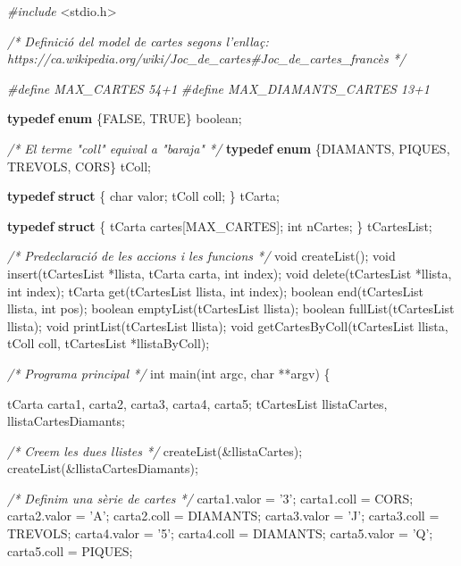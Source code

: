 \documentclass[]{book}
\newenvironment{Shaded}{\begin{snugshade}}{\end{snugshade}}
\newcommand{\KeywordTok}[1]{\textcolor[rgb]{0.13,0.29,0.53}{\textbf{#1}}}
\newcommand{\DataTypeTok}[1]{\textcolor[rgb]{0.13,0.29,0.53}{#1}}
\newcommand{\CharTok}[1]{\textcolor[rgb]{0.31,0.60,0.02}{#1}}
\newcommand{\ImportTok}[1]{#1}
\newcommand{\CommentTok}[1]{\textcolor[rgb]{0.56,0.35,0.01}{\textit{#1}}}
\newcommand{\PreprocessorTok}[1]{\textcolor[rgb]{0.56,0.35,0.01}{\textit{#1}}}
\newcommand{\NormalTok}[1]{#1}
\begin{document}
\begin{Shaded}
\begin{Highlighting}[]
\PreprocessorTok{#include }\ImportTok{<stdio.h>}

\CommentTok{/* Definició del model de cartes segons l'enllaç:}
\CommentTok{   https://ca.wikipedia.org/wiki/Joc_de_cartes#Joc_de_cartes_francès */}

\PreprocessorTok{#define MAX_CARTES 54+1}
\PreprocessorTok{#define MAX_DIAMANTS_CARTES 13+1}

\KeywordTok{typedef} \KeywordTok{enum}\NormalTok{ \{FALSE, TRUE\} boolean;}

\CommentTok{/* El terme "coll" equival a "baraja" */}
\KeywordTok{typedef} \KeywordTok{enum}\NormalTok{ \{DIAMANTS, PIQUES, TREVOLS, CORS\} tColl;}

\KeywordTok{typedef} \KeywordTok{struct}\NormalTok{ \{}
    \DataTypeTok{char}\NormalTok{ valor;}
\NormalTok{    tColl coll;}
\NormalTok{\} tCarta;}

\KeywordTok{typedef} \KeywordTok{struct}\NormalTok{ \{}
\NormalTok{    tCarta cartes[MAX_CARTES];}
    \DataTypeTok{int}\NormalTok{ nCartes;}
\NormalTok{\} tCartesList;}

\CommentTok{/* Predeclaració de les accions i les funcions */}
\DataTypeTok{void}\NormalTok{ createList();}
\DataTypeTok{void}\NormalTok{ insert(tCartesList *llista, tCarta carta, }\DataTypeTok{int}\NormalTok{ index);}
\DataTypeTok{void}\NormalTok{ delete(tCartesList *llista, }\DataTypeTok{int}\NormalTok{ index);}
\NormalTok{tCarta get(tCartesList llista, }\DataTypeTok{int}\NormalTok{ index);}
\NormalTok{boolean end(tCartesList llista, }\DataTypeTok{int}\NormalTok{ pos);}
\NormalTok{boolean emptyList(tCartesList llista);}
\NormalTok{boolean fullList(tCartesList llista);}
\DataTypeTok{void}\NormalTok{ printList(tCartesList llista);}
\DataTypeTok{void}\NormalTok{ getCartesByColl(tCartesList llista, tColl coll, tCartesList *llistaByColl);}

\CommentTok{/* Programa principal */}
\DataTypeTok{int}\NormalTok{ main(}\DataTypeTok{int}\NormalTok{ argc, }\DataTypeTok{char}\NormalTok{ **argv) \{}

\NormalTok{    tCarta carta1, carta2, carta3, carta4, carta5;}
\NormalTok{    tCartesList llistaCartes, llistaCartesDiamants;}

    \CommentTok{/* Creem les dues llistes */}
\NormalTok{    createList(&llistaCartes);}
\NormalTok{    createList(&llistaCartesDiamants);}

    \CommentTok{/* Definim una sèrie de cartes */}
\NormalTok{    carta1.valor = }\CharTok{'3'}\NormalTok{;}
\NormalTok{    carta1.coll = CORS;}
\NormalTok{    carta2.valor = }\CharTok{'A'}\NormalTok{;}
\NormalTok{    carta2.coll = DIAMANTS;}
\NormalTok{    carta3.valor = }\CharTok{'J'}\NormalTok{;}
\NormalTok{    carta3.coll = TREVOLS;}
\NormalTok{    carta4.valor = }\CharTok{'5'}\NormalTok{;}
\NormalTok{    carta4.coll = DIAMANTS;}
\NormalTok{    carta5.valor = }\CharTok{'Q'}\NormalTok{;}
\NormalTok{    carta5.coll = PIQUES;}


\end{Highlighting}
\end{Shaded}
\end{document}
